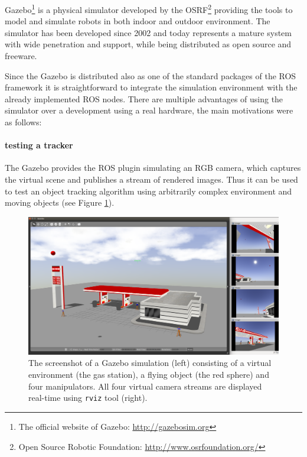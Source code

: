 Gazebo\footnote{The official website of Gazebo: \url{http://gazebosim.org}} is a physical simulator developed by the OSRF\footnote{Open Source Robotic Foundation: \url{http://www.osrfoundation.org/}} providing the tools to model and simulate robots in both indoor and outdoor environment. The simulator has been developed since 2002 and today represents a mature system with wide penetration and support, while being distributed as open source and freeware. 

Since the Gazebo is distributed also as one of the standard packages of the ROS framework it is straightforward to integrate the simulation environment with the already implemented ROS nodes. There are multiple advantages of using the simulator over a development using a real hardware, the main motivations were as follows:

\paragraph{testing a tracker} The Gazebo provides the ROS plugin simulating an RGB camera, which captures the virtual scene and publishes a stream of rendered images. Thus it can be used to test an object tracking algorithm using arbitrarily complex environment and moving objects (see Figure \ref{fig:gazebo_camera_stream}).

\begin{figure}[htb]
	\centering
	\includegraphics[width=14.5cm]{fig/gazebo_camera_stream.png}
	\caption{The screenshot of a Gazebo simulation (left) consisting of a virtual environment (the gas station), a flying object (the red sphere) and four manipulators. All four virtual camera streams are displayed real-time using \texttt{rviz} tool (right).}
	\label{fig:gazebo_camera_stream}
\end{figure}

